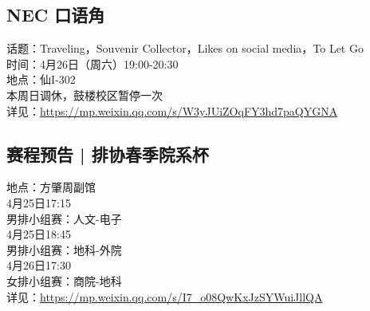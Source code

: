 \documentclass[letterpaper, 12pt]{article}
\begin{document}
\begin{multicols}{2}
\subsection{NEC 口语角} %
话题：Traveling，Souvenir Collector，Likes on social media，To Let Go
\\时间：4月26日（周六）19:00-20:30
\\地点：仙I-302
\\本周日调休，鼓楼校区暂停一次
\\详见：\url{https://mp.weixin.qq.com/s/W3yJUiZOqFY3hd7paQYGNA}

\subsection{赛程预告 | 排协春季院系杯} %
地点：方肇周副馆
\\4月25日17:15
\\男排小组赛：人文-电子
\\4月25日18:45
\\男排小组赛：地科-外院
\\4月26日17:30
\\女排小组赛：商院-地科
\\详见：\url{https://mp.weixin.qq.com/s/I7_o08QwKxJzSYWuiJllQA}
\end{multicols}
\end{document}
